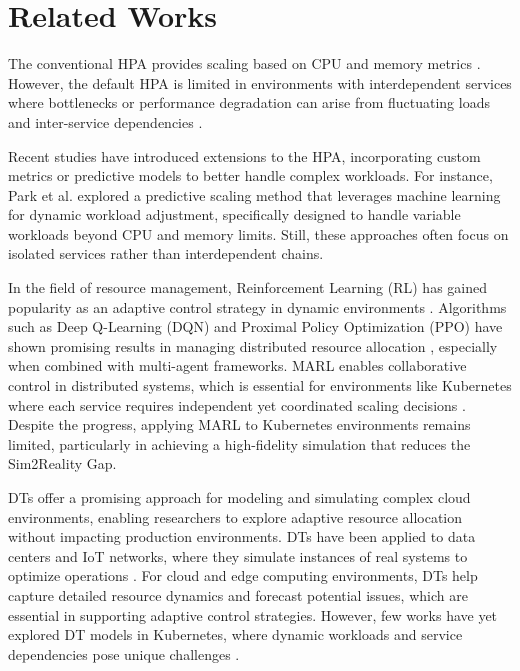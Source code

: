 \documentclass[conference]{IEEEtran}
\begin{document}
\section{Related Works}
\label{sec:related_work}

The conventional HPA provides scaling based on CPU and memory metrics \cite{hpa_design}. However, the default HPA is limited in environments with interdependent services where bottlenecks or performance degradation can arise from fluctuating loads and inter-service dependencies \cite{rosenberg_k8s_autoscaling}. 

Recent studies have introduced extensions to the HPA, incorporating custom metrics or predictive models to better handle complex workloads. For instance, Park et al. \cite{park_predictive_scaling} explored a predictive scaling method that leverages machine learning for dynamic workload adjustment, specifically designed to handle variable workloads beyond CPU and memory limits. Still, these approaches often focus on isolated services rather than interdependent chains.

In the field of resource management, Reinforcement Learning (RL) has gained popularity as an adaptive control strategy in dynamic environments \cite{li_rl_resource_allocation}. Algorithms such as Deep Q-Learning (DQN) and Proximal Policy Optimization (PPO) have shown promising results in managing distributed resource allocation \cite{schwartz_drl_cloud}, especially when combined with multi-agent frameworks. MARL enables collaborative control in distributed systems, which is essential for environments like Kubernetes where each service requires independent yet coordinated scaling decisions \cite{zhang_marl_k8s}. Despite the progress, applying MARL to Kubernetes environments remains limited, particularly in achieving a high-fidelity simulation that reduces the Sim2Reality Gap.

DTs offer a promising approach for modeling and simulating complex cloud environments, enabling researchers to explore adaptive resource allocation without impacting production environments. DTs have been applied to data centers and IoT networks, where they simulate instances of real systems to optimize operations \cite{schleich_digital_twin}. For cloud and edge computing environments, DTs help capture detailed resource dynamics and forecast potential issues, which are essential in supporting adaptive control strategies. However, few works have yet explored DT models in Kubernetes, where dynamic workloads and service dependencies pose unique challenges \cite{liu_dt_cloud}.
\end{document}
